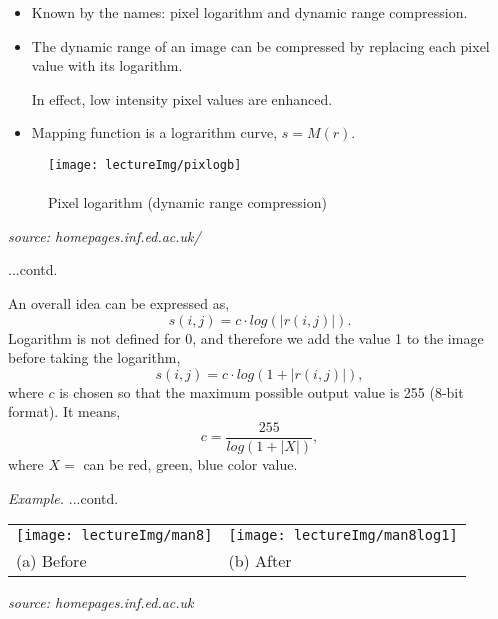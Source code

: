 \documentclass{response}
\begin{document}
{\large 

\begin{itemize}\setlength\itemsep{-0.5em}
\item Known by the names: pixel logarithm and dynamic range compression.
\item The dynamic range of an image can be compressed by replacing each pixel value with its logarithm. 

In effect, low intensity pixel values are enhanced.
\item Mapping function is a lograrithm curve, $s = M(r)$.
\end{itemize}

\begin{figure}[hbp]
\centering
\texttt{[image: lectureImg/pixlogb]}\\
\mbox{}\\
Pixel logarithm (dynamic range compression)
\end{figure}

\vfill
{\small \textit{source: homepages.inf.ed.ac.uk/}}


\newpage

\bigskip

...contd.

\vspace{1cm}

An overall idea can be expressed as, 
\[
s(i,j) = c \cdot log(|r(i,j)|).
\]
Logarithm is not defined for 0, and therefore we add the value 1 to the image before taking the logarithm,
\[
s(i,j) = c \cdot log(1+ |r(i,j)|),
\]
where $c$ is chosen so that the maximum possible output value is 255 (8-bit format). It means, 
\[
c = \frac{255}{log(1+|X|)},
\]
where $X=$ can be red, green, blue color value.



\newpage

\bigskip

{\huge \em Example.} ...contd.

\vspace{1cm}

\begin{tabular}{ll}
\texttt{[image: lectureImg/man8]} &
\texttt{[image: lectureImg/man8log1]} \\
(a) Before & (b) After
\end{tabular}
\vfill

\textit{source: homepages.inf.ed.ac.uk}


}
\end{document}
